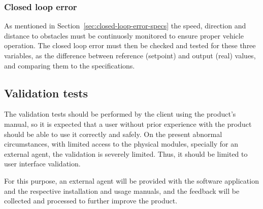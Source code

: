 \subsubsection{Closed loop error}%
\label{sec:closed-loop-error}
As mentioned in Section~\ref{sec:closed-loop-error-specs} the speed, direction and distance to obstacles must be continuosly monitored
to ensure proper vehicle operation. The closed loop error must then be checked
and tested for these three variables, as the difference between reference
(setpoint) and output (real) values, and comparing them to the specifications.
%
%
%

\subsection{Validation tests}%
\label{sec:orgff1a37d}
The validation tests should be performed by the client using the product’s
manual, so it is expected that a user without prior experience with the product
should be able to use it correctly and safely. On the present abnormal
circumstances, with limited access to the physical modules, specially for an
external agent, the validation is severely limited.
Thus, it should be limited to user interface validation.

For this purpose, an external agent will be provided with the software
application and the respective installation and usage manuals, and the feedback
will be collected and processed to further improve the product.
